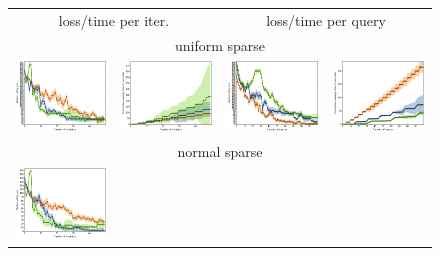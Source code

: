 \documentclass{article}
\renewcommand\[{\begin{equation}}
\renewcommand\]{\end{equation}}
\begin{document}
\begin{figure}[b]
    \centering
    {\footnotesize
    \begin{tabular}{cccc}
        \hline
        \multicolumn{2}{c}{{\sc loss/time per iter.}} &
        \multicolumn{2}{c}{{\sc loss/time per query}}
        \\
        \multicolumn{4}{c}{{\sc uniform sparse}}
        \\
        \includegraphics[width=10em]{figures/pc_with_costs_uniform_sparse_per_iter_loss} &
        \includegraphics[width=10em]{figures/pc_with_costs_uniform_sparse_per_iter_time} &
        \includegraphics[width=10em]{figures/pc_with_costs_uniform_sparse_per_query_loss} &
        \includegraphics[width=10em]{figures/pc_with_costs_uniform_sparse_per_query_time}
        \\
        \hline
        \multicolumn{4}{c}{{\sc normal sparse}}
        \\
        \includegraphics[width=10em]{figures/pc_with_costs_normal_sparse_per_iter_loss} &

\end{tabular}}
\end{figure}
\end{document}
